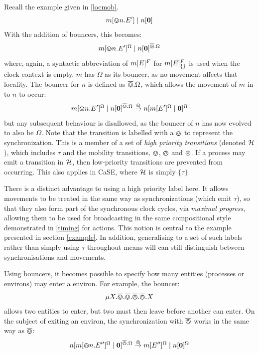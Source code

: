 Recall the example given in \ref{locmob}.
\begin{equation}
{m}[ \varovee n.E^\prime ]\;|\;{n}[ \textbf{0} ]
\end{equation}
With the addition of bouncers, this becomes:
\begin{equation}
{m}[ \varovee n.E^\prime ]^{\Omega}\;|\;{n}[ \textbf{0} ]^{\overline{\varovee}.\Omega}
\end{equation}
where, again, a syntactic abbreviation of ${m}[ E ]^{F}$ for
${m}[ E ]^{F}_{\{\}}$ is used when the clock context is empty. $m$ has
$\Omega$ as its bouncer, as no movement affects that locality.  The
bouncer for $n$ is defined as $\overline{\varovee}.\Omega$, which allows the movement
of $m$ in to $n$ to occur:
\begin{equation}
{m}[ \varovee n.E^\prime ]^{\Omega}\;|\;{n}[ \textbf{0} ]^{\overline{\varovee}.\Omega}
 \stackrel{\varovee}{\rightarrow}
{n}[ {m}[ E^\prime ]^{\Omega} \;|\; \textbf{0} ]^{\Omega}
\end{equation}
but any subsequent behaviour is disallowed, as the bouncer of $n$ has
now evolved to also be $\Omega$.  Note that the transition is labelled
with a $\varovee$ to represent the synchronization.  This is a member of a
set of \emph{high priority transitions} (denoted $\text{$\mathcal{H}$}$), which
includes $\tau$ and the mobility transitions, $\varovee$, $\varowedge$ and
$\varoast$.  If a process may emit a transition in $\text{$\mathcal{H}$}$, then
low-priority transitions are prevented from occurring.  This also
applies in CaSE, where $\text{$\mathcal{H}$}$ is simply $\{ \tau \}$.  

There is a distinct advantage to using a high priority label here.  It
allows movements to be treated in the same way as synchronizations
(which emit $\tau$), so that they also form part of the synchronous
clock cycles, via \emph{maximal progress}, allowing them to be used for
broadcasting in the same compositional style demonstrated in
\ref{timing} for actions.  This notion is central to the example
presented in section \ref{example}.  In addition, generalising to a set
of such labels rather than simply using $\tau$ throughout means will can
still distinguish between synchronisations and movements.

Using bouncers, it becomes possible to specify how many entities
(processes or environs) may enter a environ.  For example, the
bouncer:
\begin{equation}
\mu X.\overline{\varovee}.\overline{\varovee}.\overline{\varowedge}.\overline{\varowedge}.X
\end{equation}
allows two entities to enter, but two must then leave before
another can enter.  On the subject of exiting an environ, the
synchronization with $\overline{\varowedge}$ works in the same way as $\overline{\varovee}$:
\begin{equation}
{n}[ {m}[ \varowedge n.E^{\prime \prime} ]^{\Omega} \;|\; \textbf{0} ]^{\overline{\varowedge}.\Omega}
 \stackrel{\varowedge}{\rightarrow}
{m}[ E^{\prime \prime} ]^{\Omega} \;|\; {n}[ \textbf{0} ]^{\Omega}
\end{equation}

